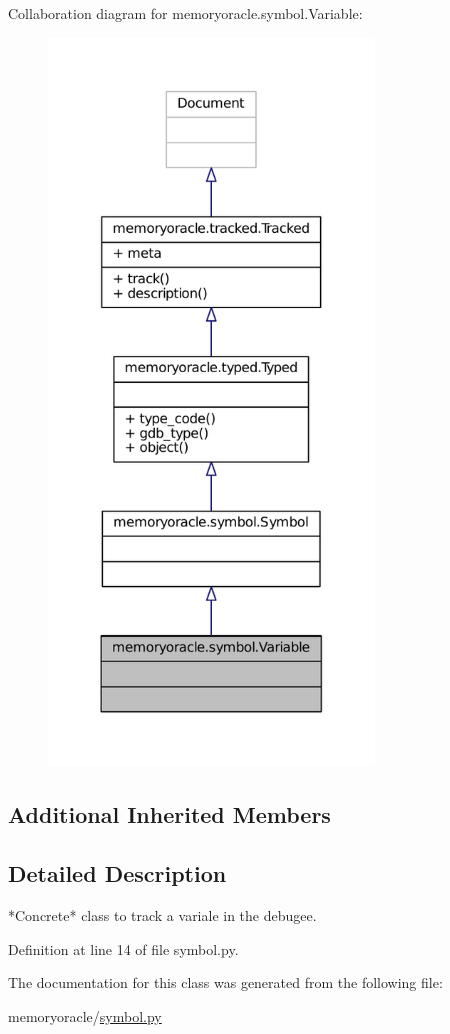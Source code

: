 Collaboration diagram for memoryoracle.\+symbol.\+Variable\+:
\nopagebreak
\begin{figure}[H]
\begin{center}
\leavevmode
\includegraphics[width=245pt]{classmemoryoracle_1_1symbol_1_1Variable__coll__graph}
\end{center}
\end{figure}
\subsection*{Additional Inherited Members}


\subsection{Detailed Description}
\begin{DoxyVerb}*Concrete* class to track a variale in the debugee.
\end{DoxyVerb}
 

Definition at line 14 of file symbol.\+py.



The documentation for this class was generated from the following file\+:\begin{DoxyCompactItemize}
\item 
memoryoracle/\hyperlink{symbol_8py}{symbol.\+py}\end{DoxyCompactItemize}
